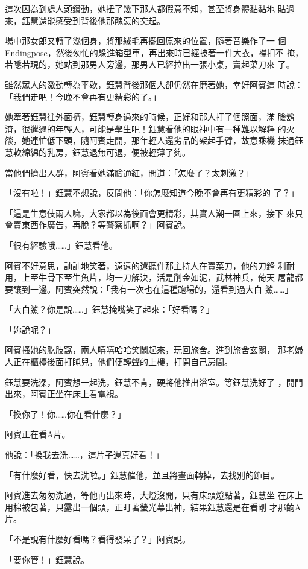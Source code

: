 這次因為到處人頭鑽動，她扭了幾下那人都假意不知，甚至將身體黏黏地
貼過來，鈺慧還能感受到背後他那醜惡的突起。

場中那女郎又轉了幾個身，將那絨毛再擺回原來的位置，隨著音樂作了一
個Endingpose，然後匆忙的躲進箱型車，再出來時已經披著一件大衣，襟扣不
掩，若隱若現的，她站到那男人旁邊，那男人已經拉出一張小桌，賣起菜刀來
了。

雖然眾人的激動轉為平歇，鈺慧背後那個人卻仍然在磨著她，幸好阿賓這
時說：「我們走吧！今晚不會再有更精彩的了。」

她牽著鈺慧往外面擠，鈺慧轉身過來的時候，正好和那人打了個照面，滿
臉鬍渣，很邋遢的年輕人，可能是學生吧！鈺慧看他的眼神中有一種難以解釋
的火燄，她連忙低下頭，隨阿賓走開，那年輕人還劣品的架起手臂，故意乘機
抹過鈺慧軟綿綿的乳房，鈺慧退無可退，便被輕薄了夠。

當他們擠出人群，阿賓看她滿臉通紅，問道：「怎麼了？太刺激？」

「沒有啦！」鈺慧不想說，反問他：「你怎麼知道今晚不會再有更精彩的
了？」

「這是生意伎兩人嘛，大家都以為後面會更精彩，其實人潮一圍上來，接下
來只會賣東西作廣告，再脫？等警察抓啊？」阿賓說。

「很有經驗哦……」鈺慧看他。

阿賓不好意思，訕訕地笑著，遠遠的還聽件那主持人在賣菜刀，他的刀鋒
利耐用，上至牛骨下至生魚片，均一刀解決，活是削金如泥，武林神兵，倚天
屠龍都要讓到一邊。阿賓突然說：「我有一次也在這種跑場的，還看到過大白
鯊……」

「大白鯊？你是說……」鈺慧掩嘴笑了起來：「好看嗎？」

「妳說呢？」

阿賓搔她的肐肢窩，兩人嘻嘻哈哈笑鬧起來，玩回旅舍。進到旅舍玄關，
那老婦人正在櫃檯後面打盹兒，他們便輕聲的上樓，打開自己房間。

鈺慧要洗澡，阿賓想一起洗，鈺慧不肯，硬將他推出浴室。等鈺慧洗好了
，開門出來，阿賓正坐在床上看電視。

「換你了！你……你在看什麼？」

阿賓正在看A片。

他說：「換我去洗……，這片子還真好看！」

「有什麼好看，快去洗啦。」鈺慧催他，並且將畫面轉掉，去找別的節目。

阿賓進去匆匆洗過，等他再出來時，大燈沒開，只有床頭燈點著，鈺慧坐
在床上用棉被包著，只露出一個頭，正盯著螢光幕出神，結果鈺慧還是在看剛
才那齣A片。

「不是說有什麼好看嗎？看得發呆了？」阿賓說。

「要你管！」鈺慧說。

